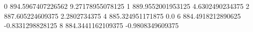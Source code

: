 0 894.5967407226562 9.27178955078125
1 889.9552001953125 4.6302490234375
2 887.605224609375 2.2802734375
4 885.324951171875 0.0
6 884.4918212890625 -0.8331298828125
8 884.3441162109375 -0.9808349609375
